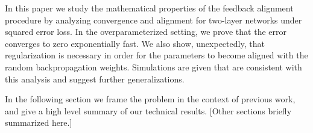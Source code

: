 In this paper we study the mathematical properties of the feedback alignment procedure by analyzing convergence and alignment for two-layer networks under squared error loss. In the overparameterized setting, we prove that the error converges to zero exponentially fast. We also show, unexpectedly, that regularization is necessary in order for the  parameters to become aligned with the random backpropagation weights. Simulations are given that are consistent with this analysis and suggest further generalizations.

In the following section we frame the problem in the context of previous work, and give
a high level summary of our technical results. [Other sections briefly summarized here.]
